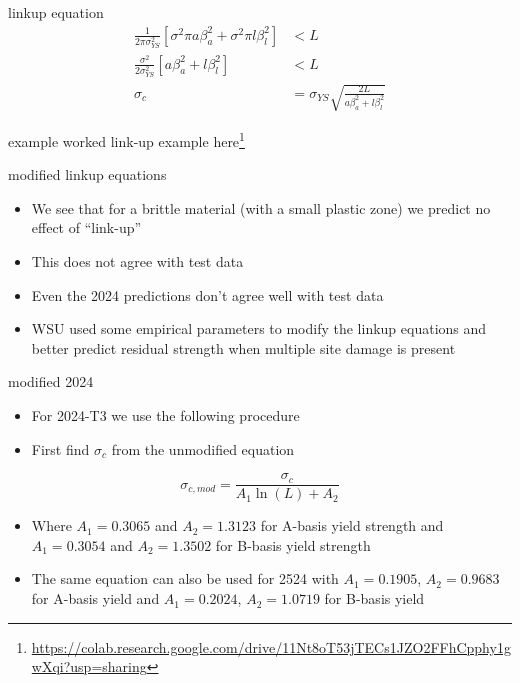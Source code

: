 \documentclass[
  letterpaper,
  ignorenonframetext,
  aspectratio=43,
  handout,
  12pt]{beamer}
\DeclareRobustCommand{\href}[2]{#2\footnote{\url{#1}}}
\providecommand{\tightlist}{%
  \setlength{\itemsep}{0pt}\setlength{\parskip}{0pt}}
\providecommand{\tightlist}{%
\setlength{\itemsep}{0pt}\setlength{\parskip}{0pt}}
\begin{document}
\begin{frame}{linkup equation}
\protect\hypertarget{linkup-equation-2}{}
\[\begin{align}
  \frac{1}{2\pi\sigma_{YS}^2} \left[\sigma^2 \pi a \beta_a^2 + \sigma^2 \pi l \beta_l^2\right] & < L \\
  \frac{\sigma^2}{2\sigma_{YS}^2} \left[a \beta_a^2 + l \beta_l^2\right] & < L \\
          \sigma_c &= \sigma_{YS}\sqrt{\frac{2L}{a \beta_a^2 + l \beta_l^2}}
\end{align}\]
\end{frame}

\begin{frame}{example}
\protect\hypertarget{example}{}
worked link-up example
\href{https://colab.research.google.com/drive/11Nt8oT53jTECs1JZO2FFhCpphy1gwXqi?usp=sharing}{here}
\end{frame}

\begin{frame}{modified linkup equations}
\protect\hypertarget{modified-linkup-equations}{}
\begin{itemize}
\tightlist
\item
  We see that for a brittle material (with a small plastic zone) we
  predict no effect of ``link-up''
\item
  This does not agree with test data
\item
  Even the 2024 predictions don't agree well with test data
\item
  WSU used some empirical parameters to modify the linkup equations and
  better predict residual strength when multiple site damage is present
\end{itemize}
\end{frame}

\begin{frame}{modified 2024}
\protect\hypertarget{modified-2024}{}
\begin{itemize}
\tightlist
\item
  For 2024-T3 we use the following procedure
\item
  First find \(\sigma_c\) from the unmodified equation
\end{itemize}

\[\sigma_{c,mod} = \frac{\sigma_c}{A_1 \ln (L) + A_2}\]

\begin{itemize}
\tightlist
\item
  Where \(A_1=0.3065\) and \(A_2=1.3123\) for A-basis yield strength and
  \(A_1=0.3054\) and \(A_2=1.3502\) for B-basis yield strength
\item
  The same equation can also be used for 2524 with \(A_1=0.1905\),
  \(A_2=0.9683\) for A-basis yield and \(A_1=0.2024\), \(A_2=1.0719\)
  for B-basis yield
\end{itemize}
\end{frame}
\end{document}
